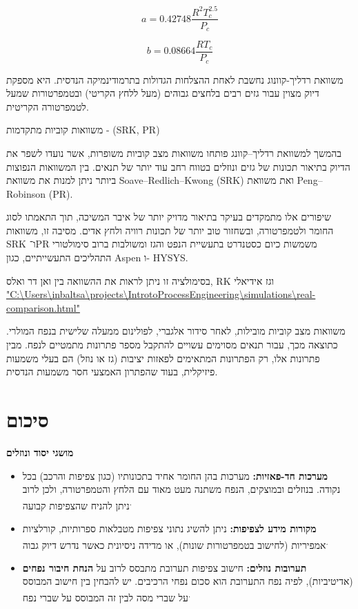 \documentclass[
  hebrew,
  letterpaper,
  DIV=11,
  numbers=noendperiod]{scrreprt}
\begin{document}
\[a = 0.42748\frac{R^{2}T_{c}^{2.5}}{P_{c}}\]

\[b = 0.08664\frac{RT_{c}}{P_{c}}\]

משוואת רדליך-קוונוג נחשבת לאחת ההצלחות הגדולות בתרמודינמיקה הנדסית. היא
מספקת דיוק מצוין עבור גזים רבים בלחצים גבוהים (מעל ללחץ הקריטי)
ובטמפרטורות שמעל לטמפרטורה הקריטית.

משוואות קוביות מתקדמות - (SRK, PR)

בהמשך למשוואת רדליך--קוונג פותחו משוואות מצב קוביות משופרות, אשר נועדו
לשפר את הדיוק בתיאור תכונות של גזים ונוזלים בטווח רחב עוד יותר של תנאים.
בין המשוואות הנפוצות ביותר ניתן למנות את משוואת Soave--Redlich--Kwong
(SRK) ואת משוואת Peng--Robinson (PR).

שיפורים אלו מתמקדים בעיקר בתיאור מדויק יותר של איבר המשיכה, תוך התאמתו
לסוג החומר ולטמפרטורה, ובשחזור טוב יותר של תכונות רוויה ולחץ אדים. מסיבה
זו, משוואות SRK ו־PR משמשות כיום כסטנדרט בתעשיית הנפט והגז ומשולבות ברוב
סימולטורי התהליכים התעשייתיים, כגון Aspen ו- HYSYS.

בסימולציה זו ניתן לראות את ההשוואה בין ואן דר ואלס, RK וגז אידיאלי\\
\href{file:///C:/Users/inbaltsa/projects/IntrotoProcessEngineering/simulations/real-comparison.html}{"C:\textbackslash Users\textbackslash inbaltsa\textbackslash projects\textbackslash IntrotoProcessEngineering\textbackslash simulations\textbackslash real-comparison.html"}

משוואות מצב קוביות מובילות, לאחר סידור אלגברי, לפולינום ממעלה שלישית
בנפח המולרי. כתוצאה מכך, עבור תנאים מסוימים עשויים להתקבל מספר פתרונות
מתמטיים לנפח. מבין פתרונות אלו, רק הפתרונות המתאימים לפאזות יציבות (גז
או נוזל) הם בעלי משמעות פיזיקלית, בעוד שהפתרון האמצעי חסר משמעות הנדסית.

\section{סיכום}\label{ux5e1ux5d9ux5dbux5d5ux5dd-10}

\textbf{מושגי יסוד ונוזלים}

\begin{itemize}
\item
  \textbf{מערכות חד-פאזיות:} מערכות בהן החומר אחיד בתכונותיו (כגון
  צפיפות והרכב) בכל נקודה. בנוזלים ובמוצקים, הנפח משתנה מעט מאוד עם הלחץ
  והטמפרטורה, ולכן לרוב ניתן להניח שהצפיפות קבועה\textsuperscript{.}
\item
  \textbf{מקורות מידע לצפיפות:} ניתן להשיג נתוני צפיפות מטבלאות
  ספרותיות, קורלציות אמפיריות (לחישוב בטמפרטורות שונות), או מדידה
  ניסיונית כאשר נדרש דיוק גבוה\textsuperscript{.}
\item
  \textbf{תערובות נוזלים:} חישוב צפיפות תערובת מתבסס לרוב על
  \textbf{הנחת חיבור נפחים} (אדיטיביות), לפיה נפח התערובת הוא סכום נפחי
  הרכיבים. יש להבחין בין חישוב המבוסס על שברי מסה לבין זה המבוסס על שברי
  נפח\textsuperscript{.}
\end{itemize}
\end{document}
